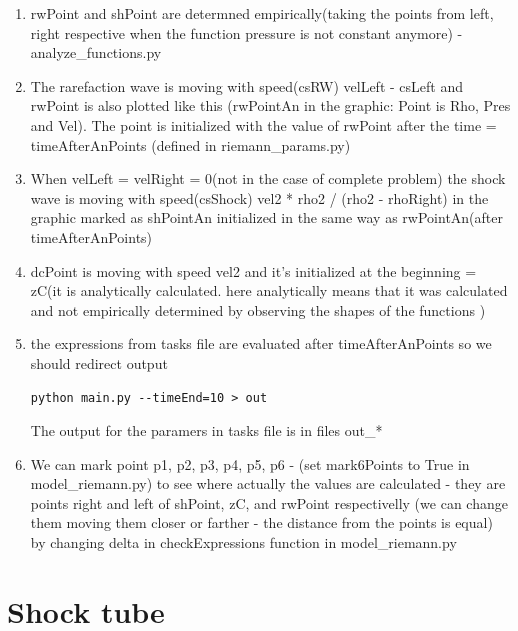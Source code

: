 \documentclass[12pt]{book}
\begin{document}
\begin{enumerate}
\item rwPoint and shPoint are determned empirically(taking the points from left, right respective when the function pressure is not constant anymore) - analyze\_functions.py
\item The rarefaction wave is moving  with speed(csRW) velLeft - csLeft and rwPoint is also plotted like this (rwPointAn in the graphic: Point is Rho, Pres and Vel). The point is initialized with the value of rwPoint after the time = timeAfterAnPoints (defined in riemann\_params.py)
\item When velLeft = velRight = 0(not in the case of complete problem) the shock wave is moving  with speed(csShock) vel2 * rho2 / (rho2 - rhoRight) in the graphic marked as shPointAn
initialized in the same way as rwPointAn(after timeAfterAnPoints)
\item dcPoint is moving with speed vel2 and it's initialized at the beginning = zC(it is analytically calculated. here analytically means that it was calculated and not empirically determined by observing the shapes of the functions )
\item the expressions from tasks file are evaluated after timeAfterAnPoints so we should redirect output
\begin{verbatim}
python main.py --timeEnd=10 > out
\end{verbatim}
The output for the paramers in tasks file is in files out\_*
\item We can mark point p1, p2, p3, p4, p5, p6 - (set mark6Points to True in model\_riemann.py) to see where actually the values are calculated - they are points right and left of shPoint, zC, and rwPoint respectivelly
(we can change them moving them closer or farther - the distance from the points is equal) by changing  delta  in checkExpressions function in model\_riemann.py

\end{enumerate}
\section*{Shock tube}
\end{document}
